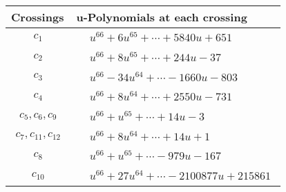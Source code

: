 \documentclass[1p]{elsarticle_modified}
\theoremstyle{definition}
\begin{document}
\begin{tabular}{m{50pt}|m{274pt}}
Crossings & \hspace{64pt}u-Polynomials at each crossing \\
\hline $$\begin{aligned}c_{1}\end{aligned}$$&$\begin{aligned}
&u^{66}+6 u^{65}+\cdots+5840 u+651
\end{aligned}$\\
\hline $$\begin{aligned}c_{2}\end{aligned}$$&$\begin{aligned}
&u^{66}+8 u^{65}+\cdots+244 u-37
\end{aligned}$\\
\hline $$\begin{aligned}c_{3}\end{aligned}$$&$\begin{aligned}
&u^{66}-34 u^{64}+\cdots-1660 u-803
\end{aligned}$\\
\hline $$\begin{aligned}c_{4}\end{aligned}$$&$\begin{aligned}
&u^{66}+8 u^{64}+\cdots+2550 u-731
\end{aligned}$\\
\hline $$\begin{aligned}c_{5},c_{6},c_{9}\end{aligned}$$&$\begin{aligned}
&u^{66}+u^{65}+\cdots+14 u-3
\end{aligned}$\\
\hline $$\begin{aligned}c_{7},c_{11},c_{12}\end{aligned}$$&$\begin{aligned}
&u^{66}+8 u^{64}+\cdots+14 u+1
\end{aligned}$\\
\hline $$\begin{aligned}c_{8}\end{aligned}$$&$\begin{aligned}
&u^{66}+u^{65}+\cdots-979 u-167
\end{aligned}$\\
\hline $$\begin{aligned}c_{10}\end{aligned}$$&$\begin{aligned}
&u^{66}+27 u^{64}+\cdots-2100877 u+215861
\end{aligned}$\\
\hline
\end{tabular}\\~\\
\end{document}
